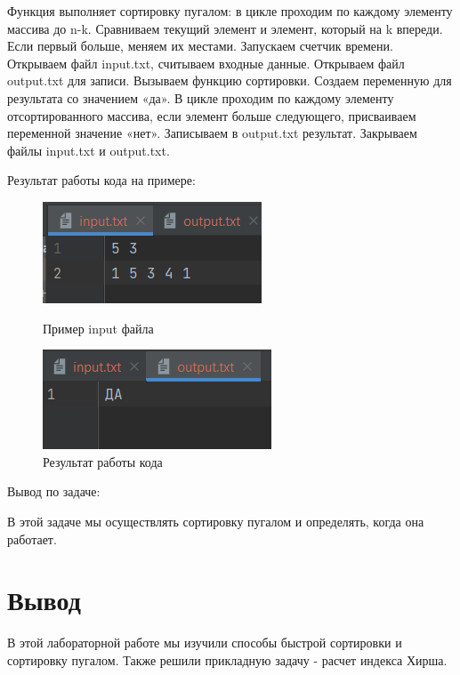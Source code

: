 Функция выполняет сортировку пугалом: в цикле проходим по каждому элементу массива до n-k. Сравниваем текущий элемент и элемент, который на k впереди. Если первый больше, меняем их местами.
Запускаем счетчик времени. Открываем файл input.txt, считываем входные данные. Открываем файл output.txt для записи. Вызываем функцию сортировки. Создаем переменную для результата со значением «да». В цикле проходим по каждому элементу отсортированного массива, если элемент больше следующего, присваиваем переменной значение «нет». Записываем в output.txt результат. Закрываем файлы input.txt и output.txt. 

Результат работы кода на примере:

\begin{figure}[H]
	\begin{center}
		\includegraphics[scale=1]{fig/input2.png}
		\caption{Пример input файла}
		\label{pic:input2} %
	\end{center}
        \begin{center}
		\includegraphics[scale=0.9]{fig/output2.png}
		\caption{Результат работы кода}
		\label{pic:output2} %
	\end{center}
\end{figure}

Вывод по задаче:

В этой задаче мы осуществлять сортировку пугалом и определять, когда она работает.

\newpage
\section*{Вывод}
В этой лабораторной работе мы изучили способы быстрой сортировки и сортировку пугалом. Также решили прикладную задачу - расчет индекса Хирша.
